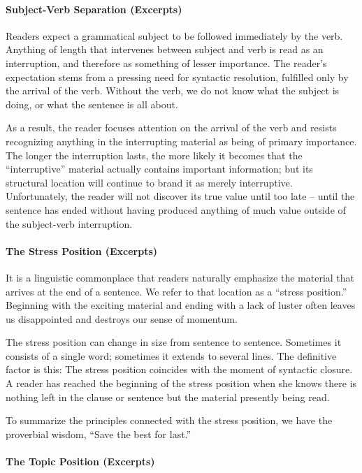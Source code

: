 \paragraph{Subject-Verb Separation (Excerpts)}

  Readers expect a grammatical subject to be followed immediately by the verb. Anything of length that intervenes between subject and verb is read as an interruption, and therefore as something of lesser importance.
The reader’s expectation stems from a pressing need for syntactic resolution, fulfilled only by the arrival of the verb. Without the verb, we do not know what the subject is doing, or what the sentence is all about.

As a result, the reader focuses attention on the arrival of the verb and resists recognizing anything in the interrupting material as being of primary importance.
The longer the interruption lasts, the more likely it becomes that the “interruptive” material actually contains important information; but its structural location will continue to brand it as merely interruptive.
Unfortunately, the reader will not discover its true value until too late – until the sentence has ended without having produced anything of much value outside of the subject-verb interruption.

\paragraph{The Stress Position (Excerpts)}

It is a linguistic commonplace that readers naturally emphasize the material that arrives at the end of a sentence. We refer to that location as a “stress position.”
Beginning with the exciting material and ending with a lack of luster often leaves us disappointed and destroys our sense of momentum.

The stress position can change in size from sentence to sentence. Sometimes it consists of a single word; sometimes it extends to several lines. The definitive factor is this: The stress position coincides with the moment of syntactic closure. A reader has reached the beginning of the stress position when she knows there is nothing left in the clause or sentence but the material presently being read.

To summarize the principles connected with the stress position, we have the proverbial wisdom, “Save the best for last.”

\paragraph{The Topic Position (Excerpts)}

